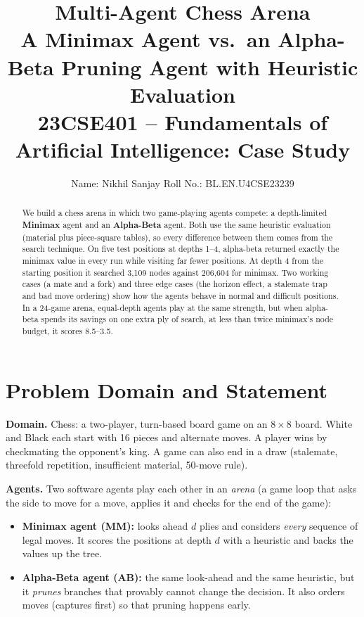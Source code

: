 \documentclass[11pt,a4paper]{article}
\title{\textbf{Multi-Agent Chess Arena}\\[4pt]
\large A Minimax Agent vs.\ an Alpha-Beta Pruning Agent with Heuristic Evaluation\\[2pt]
\normalsize 23CSE401 -- Fundamentals of Artificial Intelligence: Case Study}
\author{Name: Nikhil Sanjay \qquad Roll No.: BL.EN.U4CSE23239}
\date{}
\begin{document}
\maketitle

\begin{abstract}
We build a chess arena in which two game-playing agents compete: a depth-limited
\textbf{Minimax} agent and an \textbf{Alpha-Beta} agent. Both use the same heuristic evaluation
(material plus piece-square tables), so every difference between them comes from the search
technique. On five test positions at depths 1--4, alpha-beta returned exactly the minimax value in every run
while visiting far fewer positions. At depth 4 from the starting position it searched 3,109 nodes against
206,604 for minimax. Two working cases (a mate and a fork) and three edge cases (the horizon effect, a
stalemate trap and bad move ordering) show how the agents behave in normal and difficult positions. In a
24-game arena, equal-depth agents play at the same strength, but when alpha-beta spends its savings on one extra ply of
search, at less than twice minimax's node budget, it scores 8.5--3.5.
\end{abstract}

\section{Problem Domain and Statement}
\textbf{Domain.} Chess: a two-player, turn-based board game on an $8\times8$ board. White and Black
each start with 16 pieces and alternate moves. A player wins by checkmating the opponent's king. A game
can also end in a draw (stalemate, threefold repetition, insufficient material, 50-move rule).

\textbf{Agents.} Two software agents play each other in an \emph{arena} (a game loop that
asks the side to move for a move, applies it and checks for the end of the game):
\begin{itemize}
\item \textbf{Minimax agent (MM):} looks ahead $d$ plies and considers \emph{every} sequence of legal
moves. It scores the positions at depth $d$ with a heuristic and backs the values up the tree.
\item \textbf{Alpha-Beta agent (AB):} the same look-ahead and the same heuristic, but it
\emph{prunes} branches that provably cannot change the decision. It also orders moves (captures first) so that
pruning happens early.
\end{itemize}
\end{document}
